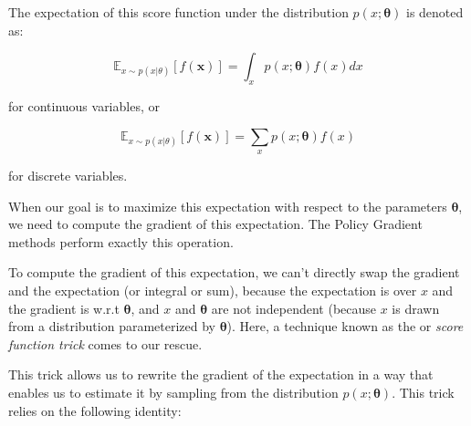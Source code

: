 The expectation of this score function under the distribution $p(x; \boldsymbol{\theta})$ is denoted as: 

\begin{equation}
\mathbb{E}_{x \sim p(x|\theta)}[f(\boldsymbol{x})] = \int_x p(x; \boldsymbol{\theta}) f(x) dx 
\end{equation}

for continuous variables, or 

\begin{equation}
\mathbb{E}_{x \sim p(x|\theta)}[f(\boldsymbol{x})] = \sum_x p(x; \boldsymbol{\theta}) f(x) 
\end{equation}

for discrete variables.

When our goal is to maximize this expectation with respect to the parameters $\boldsymbol{\theta}$, we need to compute the gradient of this expectation. The Policy Gradient methods perform exactly this operation.

To compute the gradient of this expectation, we can't directly swap the gradient and the expectation (or integral or sum), because the expectation is over $x$ and the gradient is w.r.t $\boldsymbol{\theta}$, and $x$ and $\boldsymbol{\theta}$ are not independent (because $x$ is drawn from a distribution parameterized by $\boldsymbol{\theta}$). Here, a technique known as the  or \textit{score function trick} comes to our rescue.

This trick allows us to rewrite the gradient of the expectation in a way that enables us to estimate it by sampling from the distribution $p(x; \boldsymbol{\theta})$. This trick relies on the following identity:

